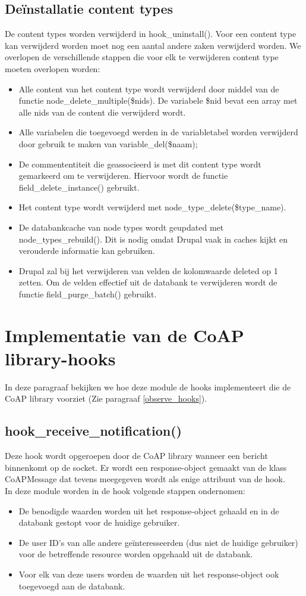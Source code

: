 \subsection{De\"{i}nstallatie content types}
De content types worden verwijderd in hook\_uninstall(). Voor een content type kan verwijderd worden moet nog een aantal andere zaken verwijderd worden. We overlopen de verschillende stappen die voor elk te verwijderen content type moeten overlopen worden:
\begin{itemize}
\item Alle content van het content type wordt verwijderd door middel van de functie node\_delete\_multiple(\$nids). De variabele \$nid bevat een array met alle nids van de content die verwijderd wordt.
\item Alle variabelen die toegevoegd werden in de variabletabel worden verwijderd door gebruik te maken van variable\_del(\$naam);
\item De commententiteit die geassocieerd is met dit content type wordt gemarkeerd om te verwijderen. Hiervoor wordt de functie field\_delete\_instance() gebruikt.
\item Het content type wordt verwijderd met node\_type\_delete(\$type\_name).
\item De databankcache van node types wordt geupdated met node\_types\_rebuild(). Dit is nodig omdat Drupal vaak in caches kijkt en verouderde informatie kan gebruiken.
\item Drupal zal bij het verwijderen van velden de kolomwaarde deleted op 1 zetten. Om de velden effectief uit de databank te verwijderen wordt de functie field\_purge\_batch() gebruikt.
\end{itemize}

\section{Implementatie van de CoAP library-hooks}
In deze paragraaf bekijken we hoe deze module de hooks implementeert die de CoAP library voorziet (Zie paragraaf \ref{observe_hooks}).

\subsection{hook\_receive\_notification()}
Deze hook wordt opgeroepen door de CoAP library wanneer een bericht binnenkomt op de socket. Er wordt een response-object gemaakt van de klass CoAPMessage dat tevens meegegeven wordt als enige attribuut van de hook.\\
In deze module worden in de hook volgende stappen ondernomen:
\begin{itemize}
\item De benodigde waarden worden uit het response-object gehaald en in de databank gestopt voor de huidige gebruiker.
\item De user ID's van alle andere ge\"{i}nteresseerden (dus niet de huidige gebruiker) voor de betreffende resource worden opgehaald uit de databank.
\item Voor elk van deze users worden de waarden uit het response-object ook toegevoegd aan de databank.
\end{itemize}


